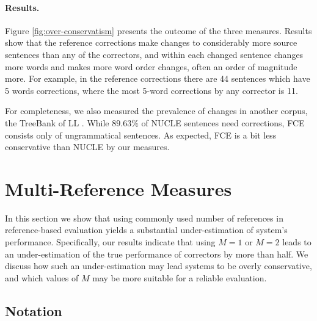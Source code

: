\documentclass[letter,11pt]{article}
\begin{document}
\paragraph{Results.}
Figure \ref{fig:over-conservatism} presents the outcome of the three measures. 
Results show that the reference corrections make changes to considerably more source sentences than any of the correctors, and within each changed sentence changes more words and makes more word order changes, often an order of magnitude more. For example, in the reference corrections there are 44 sentences which have 5 words corrections, where the most 5-word corrections by any corrector is 11.

For completeness, we also measured the prevalence of changes in
another corpus, the TreeBank of LL \cite[FCE]{yannakoudakis2011new}.
While $89.63\%$ of NUCLE sentences need corrections, FCE consists only of ungrammatical sentences. As expected, FCE is a bit less conservative than NUCLE by our measures.

		\section{Multi-Reference Measures}\label{sec:increase-reference}
		
		In this section we show that using commonly used number of references in reference-based evaluation yields a substantial under-estimation of system's performance. Specifically, our results indicate that using $M=1$ or $M=2$ leads to an under-estimation of the true performance of correctors by more than half.
		We discuss how such an under-estimation may lead systems to be
		overly conservative, and which values of $M$ may be more suitable for
		a reliable evaluation.
		
		
		
		\subsection{Notation}
		
\end{document}
